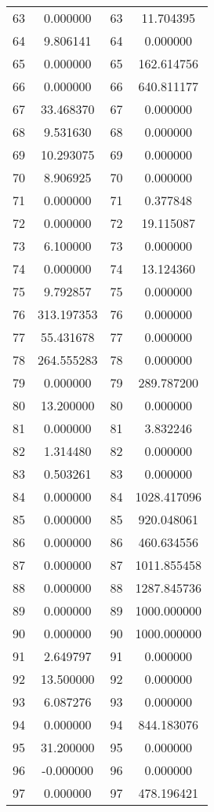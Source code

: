 \documentclass[12pt]{article}
\begin{document}
\begin{longtable}{@{}cccc@{}}
63 & 0.000000 & 63 & 11.704395 \\
64 & 9.806141 & 64 & 0.000000 \\
65 & 0.000000 & 65 & 162.614756 \\
66 & 0.000000 & 66 & 640.811177 \\
67 & 33.468370 & 67 & 0.000000 \\
68 & 9.531630 & 68 & 0.000000 \\
69 & 10.293075 & 69 & 0.000000 \\
70 & 8.906925 & 70 & 0.000000 \\
71 & 0.000000 & 71 & 0.377848 \\
72 & 0.000000 & 72 & 19.115087 \\
73 & 6.100000 & 73 & 0.000000 \\
74 & 0.000000 & 74 & 13.124360 \\
75 & 9.792857 & 75 & 0.000000 \\
76 & 313.197353 & 76 & 0.000000 \\
77 & 55.431678 & 77 & 0.000000 \\
78 & 264.555283 & 78 & 0.000000 \\
79 & 0.000000 & 79 & 289.787200 \\
80 & 13.200000 & 80 & 0.000000 \\
81 & 0.000000 & 81 & 3.832246 \\
82 & 1.314480 & 82 & 0.000000 \\
83 & 0.503261 & 83 & 0.000000 \\
84 & 0.000000 & 84 & 1028.417096 \\
85 & 0.000000 & 85 & 920.048061 \\
86 & 0.000000 & 86 & 460.634556 \\
87 & 0.000000 & 87 & 1011.855458 \\
88 & 0.000000 & 88 & 1287.845736 \\
89 & 0.000000 & 89 & 1000.000000 \\
90 & 0.000000 & 90 & 1000.000000 \\
91 & 2.649797 & 91 & 0.000000 \\
92 & 13.500000 & 92 & 0.000000 \\
93 & 6.087276 & 93 & 0.000000 \\
94 & 0.000000 & 94 & 844.183076 \\
95 & 31.200000 & 95 & 0.000000 \\
96 & -0.000000 & 96 & 0.000000 \\
97 & 0.000000 & 97 & 478.196421 \\

\end{longtable}
\end{document}
